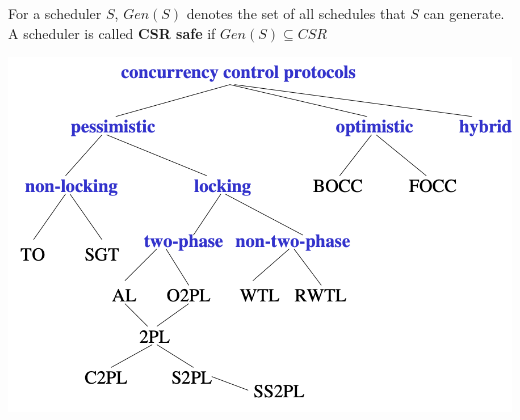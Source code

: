 \documentclass[11pt]{article}
\begin{document}
\begin{definition}
For a scheduler \(S\), \(Gen(S)\) denotes the set of all schedules that \(S\) can generate. A
scheduler is called \textbf{CSR safe} if \(Gen(S)\subseteq CSR\)
\end{definition}

\begin{center}
\includegraphics[width=.8\textwidth]{../images/bigdatabase/9.png}
\label{}
\end{center}
\end{document}

